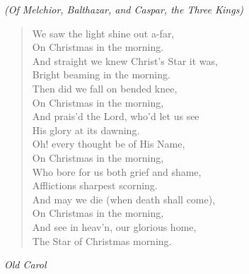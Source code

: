 
\begin{center}
\textit{(Of Melchior, Balthazar, and Caspar, the Three Kings)}
\end{center}

\begin{verse}
We saw the light shine out a-far,\\
\hspace*{2em}On Christmas in the morning.\\
And straight we knew Christ's Star it was,\\
Bright beaming in the morning.\\
Then did we fall on bended knee,\\
On Christmas in the morning,\\
And prais'd the Lord, who'd let us see\\
His glory at its dawning.\\[0.7em]

Oh! every thought be of His Name,\\
\hspace*{2em}On Christmas in the morning,\\
Who bore for us both grief and shame,\\
\hspace*{2em}Afflictions sharpest scorning.\\
And may we die (when death shall come),\\
\hspace*{2em}On Christmas in the morning,\\
And see in heav'n, our glorious home,\\
\hspace*{2em}The Star of Christmas morning.%
\end{verse}

\vspace{0.5\baselineskip}
\noindent\textit{Old Carol}

\newpage
